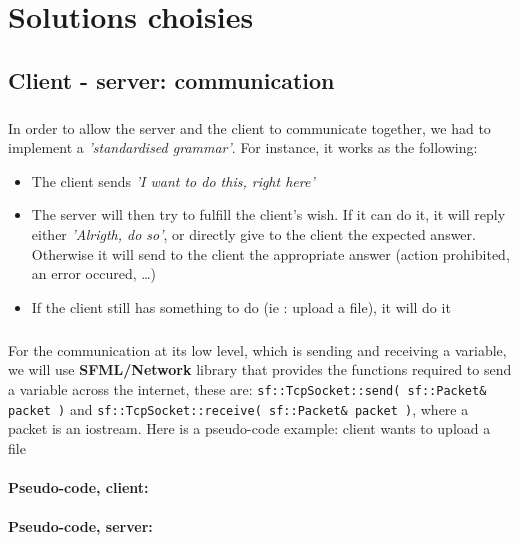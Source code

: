\documentclass[12pt,a4paper,twoside]{article}
\begin{document}
	\section{Solutions choisies} %
		\subsection{Client - server: communication} %
			\subparagraph*{}
				In order to allow the server and the client to communicate together, we had to implement a \textit{'standardised grammar'}. For instance, it works as the following:
				\begin{itemize}
					\item{} The client sends \textit{'I want to do this, right here'}
					\item{} The server will then try to fulfill the client's wish. If it can do it, it will reply either \textit{'Alrigth, do so'}, or directly give to the client the expected answer. Otherwise it will send to the client the appropriate answer (action prohibited, an error occured, \ldots{})
					\item{} If the client still has something to do (ie : upload a file), it will do it
				\end{itemize}
			\subparagraph*{}
				For the communication at its low level, which is sending and receiving a variable, we will use \textbf{SFML/Network} library that provides the functions required to send a variable across the internet, these are: \lstinline$sf::TcpSocket::send( sf::Packet& packet )$ and \lstinline$sf::TcpSocket::receive( sf::Packet& packet )$, where a packet is an iostream.
				Here is a pseudo-code example: client wants to upload a file
			\paragraph*{Pseudo-code, client:}
				
			\paragraph*{Pseudo-code, server:}
				
				
\end{document}
